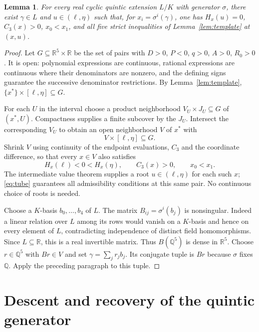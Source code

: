 \documentclass[noproofs]{rmj-public}
\newtheorem{lemma}[thm]{Lemma}
\theoremstyle{definition}
\numberwithin{equation}{section}
\newcommand{\R}{\mathbb R}
\newcommand{\Q}{\mathbb Q}
\begin{document}
\begin{lemma}\label{lem:specialize}
For every real cyclic quintic extension $L/K$ with generator $\sigma$,
there exist $\gamma\in L$ and $u\in(\ell,\eta)$ such that, for
$x_i=\sigma^i(\gamma)$, one has $H_x(u)=0$, $C_3(x)>0$, $x_0<x_1$,
and all five strict inequalities of Lemma~\ref{lem:template} at $(x,u)$.
\end{lemma}
\begin{proof}
Let $G\subseteq\R^5\times\R$ be the set of pairs with
$D>0$, $P<0$, $q>0$, $A>0$, $R_0>0$. It is open: polynomial
expressions are continuous, rational expressions are continuous where
their denominators are nonzero, and the defining signs guarantee the
successive denominator restrictions. By Lemma~\ref{lem:template},
$\{x^*\}\times[\ell,\eta]\subseteq G$.

For each $U$ in the interval choose a product neighborhood
$V_U\times J_U\subseteq G$ of $(x^*,U)$. Compactness supplies a finite
subcover by the $J_U$. Intersect the corresponding $V_U$ to obtain an
open neighborhood $V$ of $x^*$ with
\begin{equation}\label{eq:tube}
V\times[\ell,\eta]\subseteq G.
\end{equation}
Shrink $V$ using continuity of the endpoint evaluations, $C_3$ and the
coordinate difference, so that every $x\in V$ also satisfies
\[
H_x(\ell)<0<H_x(\eta),\qquad C_3(x)>0,\qquad x_0<x_1.
\]
The intermediate value theorem supplies a root $u\in(\ell,\eta)$
for each such $x$; \eqref{eq:tube} guarantees all admissibility
conditions at this same pair. No continuous choice of roots is needed.

Choose a $K$-basis $b_0,\ldots,b_4$ of $L$. The matrix
$B_{ij}=\sigma^i(b_j)$ is nonsingular. Indeed a linear relation over
$L$ among its rows would vanish on a $K$-basis and hence on every
element of $L$, contradicting independence of distinct field
homomorphisms. Since $L\subseteq\R$, this is a real invertible matrix.
Thus $B(\Q^5)$ is dense in $\R^5$. Choose $r\in\Q^5$ with $Br\in V$
and set $\gamma=\sum_jr_jb_j$. Its conjugate tuple is $Br$ because
$\sigma$ fixes $\Q$. Apply the preceding paragraph to this tuple.
\end{proof}

\section{Descent and recovery of the quintic generator}\label{sec:recovery}
\end{document}
